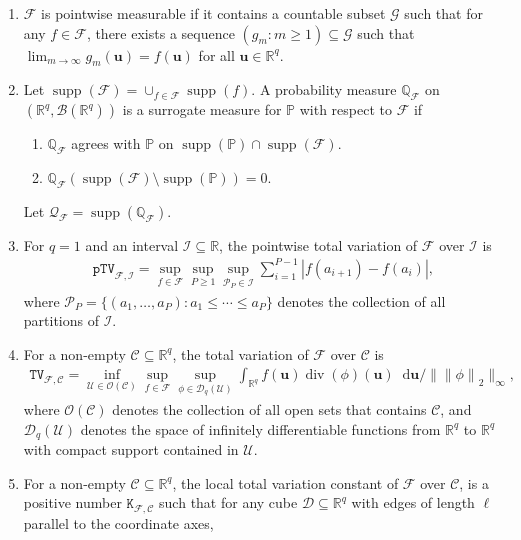 \documentclass[10pt]{article}
\DeclareMathOperator{\supp}{supp}
\renewcommand{\P}{\mathbb{P}}
\newcommand{\reals}{\mathbb{R}}
\newcommand{\dif}{\mathop{}\!\mathrm{d}}
\newcommand{\norm}[1]{\left\lVert#1\right\rVert}
\newcommand{\infnorm}[1]{\lVert #1 \rVert_{\infty}}
\newcommand{\bu}{\mathbf{u}}
\newcommand{\B}{\mathcal{B}}
\newcommand{\F}{\mathcal{F}}
\newcommand{\G}{\mathcal{G}}
\newcommand{\calP}{\mathcal{P}}
\newcommand{\bbQ}{\mathbb{Q}}
\newcommand{\ttK}{\mathtt{K}}
\newcommand{\ttTV}{\mathtt{TV}}
\begin{document}
\begin{enumerate}[label=(\roman*)]
    \item  $\F$ is pointwise measurable if it contains a countable subset $\G$ such that for any $f \in \F$, there exists a sequence $(g_m:m\geq1) \subseteq \G$ such that $\lim_{m \to \infty} g_m(\bu) = f(\bu)$ for all $\bu \in \reals^q$.
    \item  Let $\supp(\F) = \cup_{f \in \F}\supp(f)$. A probability measure $\bbQ_\F$ on $(\reals^q,\B(\reals^q))$ is a surrogate measure for $\P$ with respect to $\F$ if
    \begin{enumerate}[label=(\roman*)]
        \item $\bbQ_\F$ agrees with $\P$ on $\supp(\P) \cap \supp(\F)$.
        \item $\bbQ_\F(\supp(\F) \setminus \supp(\P)) = 0$.
    \end{enumerate}
    Let $\mathcal{Q}_\F=\supp(\bbQ_\F)$.
    \item For $q=1$ and an interval $\mathcal{I}\subseteq\reals$, the pointwise total variation of $\F$ over $\mathcal{I}$ is
    \begin{align*}
        \mathtt{pTV}_{\F,\mathcal{I}} = \sup_{f \in \F} \sup_{P\geq1}\sup_{\calP_P \in \mathcal{I}} \sum_{i = 1}^{P-1}|f(a_{i+1}) - f(a_i)|,
    \end{align*}
    where $\calP_P=\{(a_1,\dots,a_P):a_1 \leq \cdots \leq a_P\}$ denotes the collection of all partitions of $\mathcal{I}$.
    \item For a non-empty $\mathcal{C} \subseteq \reals^q$, the total variation of $\F$ over $\mathcal{C}$ is
    \begin{align*}
        \ttTV_{\F, \mathcal{C}} = \inf_{\mathcal{U} \in \mathcal{O}(\mathcal{C})}\sup_{f \in \F} \sup_{\phi \in \mathscr{D}_{q}(\mathcal{U})} \int_{\reals^q} f(\bu)\operatorname{div}(\phi)(\bu) \dif \bu / \infnorm{\norm{\phi}_2},
    \end{align*}
    where $\mathcal{O}(\mathcal{C})$ denotes the collection of all open sets that contains $\mathcal{C}$, and $\mathscr{D}_{q}(\mathcal{U})$ denotes the space of infinitely differentiable functions from $\reals^q$ to $\reals^q$ with compact support contained in $\mathcal{U}$.
    \item For a non-empty $\mathcal{C} \subseteq \reals^q$, the local total variation constant of $\F$ over $\mathcal{C}$, is a positive number $\ttK_{\F,\mathcal{C}}$ such that for any cube $\mathcal{D} \subseteq \reals^q$ with edges of length $\ell$ parallel to the coordinate axes,

\end{enumerate}
\end{document}
